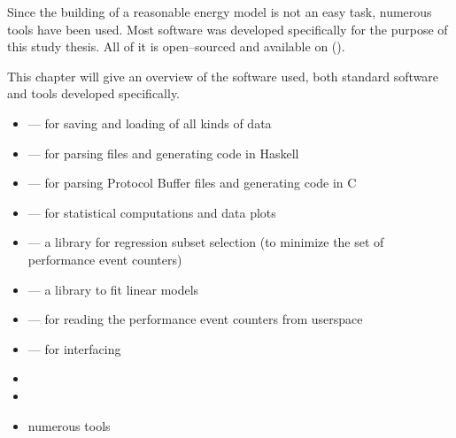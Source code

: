 \label{sec:tools}

Since the building of a reasonable energy model is not an easy task, numerous
tools have been used. Most software was developed specifically for the purpose
of this study thesis. All of it is open--sourced and available on
().

This chapter will give an overview of the software used, both standard software
and tools developed specifically.


\label{sec:standard-software}

\begin{itemize}

\item \JWTLprotobuf{} --- for saving and loading of all kinds of data

\item
{}
{} --- for parsing \JWTprotobuf{} files and generating
code in Haskell

\item {} ---
for parsing Protocol Buffer files and generating code in C

\item \JWTLR{} --- for statistical computations and data plots

\item {}
--- a \JWTR{} library for regression subset selection (to minimize the set of
performance event counters)

\item
{}
{} --- a \JWTR{} library to fit linear models

\item {}
{} --- for reading the performance event counters from userspace

\item \JWTLnidaqmxbase{} --- for interfacing \JWPni

\item {}

\item {}

\item numerous  tools

\end{itemize}


